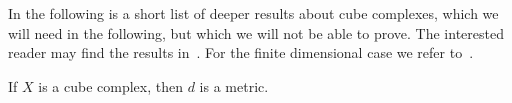 
In the following is a short list of deeper results about cube complexes, which we will need in the following, but which we will not be able to prove. The interested reader may find the results in~\cite[Appendices A, B]{MR3029427}. For the finite dimensional case we refer to~\cite[Sec. I.7, II.5]{MR1744486}.

\begin{thm}[{\cite[I.7.10]{MR1744486}}]
  If \(X\) is a cube complex, then \(d\) is a metric.
\end{thm}



